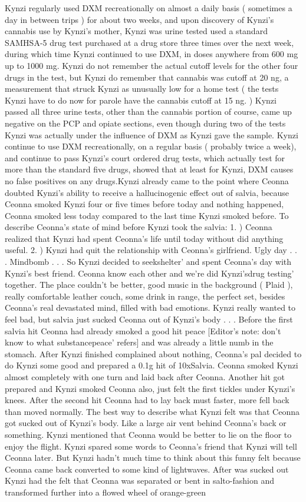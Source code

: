 \documentclass[12pt]{book}
\begin{document}
Kynzi regularly used DXM recreationally on almost a daily basis ( sometimes a day in between trips ) for about two weeks, and upon discovery of Kynzi's cannabis use by Kynzi's mother, Kynzi was urine tested used a standard SAMHSA-5 drug test purchased at a drug store three times over the next week, during which time Kynzi continued to use DXM, in doses anywhere from 600 mg up to 1000 mg. Kynzi do not remember the actual cutoff levels for the other four drugs in the test, but Kynzi do remember that cannabis was cutoff at 20 ng, a measurement that struck Kynzi as unusually low for a home test ( the tests Kynzi have to do now for parole have the cannabis cutoff at 15 ng. ) Kynzi passed all three urine tests, other than the cannabis portion of course, came up negative on the PCP and opiate sections, even though during two of the tests Kynzi was actually under the influence of DXM as Kynzi gave the sample. Kynzi continue to use DXM recreationally, on a regular basis ( probably twice a week), and continue to pass Kynzi's court ordered drug tests, which actually test for more than the standard five drugs, showed that at least for Kynzi, DXM causes no false positives on any drugs.Kynzi already came to the point where Ceonna doubted Kynzi's ability to receive a hallucinogenic effect out of salvia, because Ceonna smoked Kynzi four or five times before today and nothing happened, Ceonna smoked less today compared to the last time Kynzi smoked before. To describe Ceonna's state of mind before Kynzi took the salvia: 1. ) Ceonna realized that Kynzi had spent Ceonna's life until today without did anything useful. 2. ) Kynzi had quit the relationship with Ceonna's girlfriend. Ugly day . . .  Mindbomb . . .  So Kynzi decided to seekshelter' and spent Ceonna's day with Kynzi's best friend. Ceonna know each other and we're did Kynzi'sdrug testing' together. The place couldn't be better, good music in the background (  Plaid ), really comfortable leather couch, some drink in range, the perfect set, besides Ceonna's real devastated mind, filled with bad emotions. Kynzi really wanted to feel bad, but salvia just sucked Ceonna out of Kynzi's body . . .  Before the first salvia hit Ceonna had already smoked a good hit peace [Editor's note: don't know to what substancepeace' refers] and was already a little numb in the stomach. After Kynzi finished complained about nothing, Ceonna's pal decided to do Kynzi some good and prepared a 0.1g hit of 10xSalvia. Ceonna smoked Kynzi almost completely with one turn and laid back after Ceonna. Another hit got prepared and Kynzi smoked Ceonna also, just felt the first tickles under Kynzi's knees. After the second hit Ceonna had to lay back must faster, more fell back than moved normally. The best way to describe what Kynzi felt was that Ceonna got sucked out of Kynzi's body. Like a large air vent behind Ceonna's back or something. Kynzi mentioned that Ceonna would be better to lie on the floor to enjoy the flight. Kynzi spared some words to Ceonna's friend that Kynzi will tell Ceonna later. But Kynzi hadn't much time to think about this funny felt because Ceonna came back converted to some kind of lightwaves. After was sucked out Kynzi had the felt that Ceonna was separated or bent in salto-fashion and transformed further into a flowed wheel of orange-green 
\end{document}
